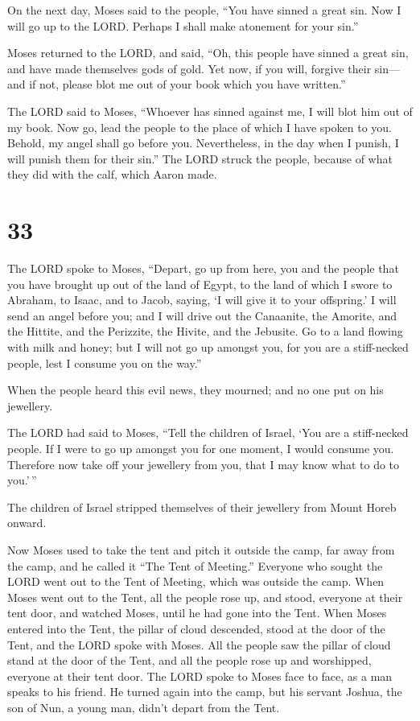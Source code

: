  On the next day, Moses said to the people, ``You have
sinned a great sin. Now I will go up to the LORD. Perhaps I shall make
atonement for your sin.''

 Moses returned to the LORD, and said, ``Oh, this people
have sinned a great sin, and have made themselves gods of gold.
 Yet now, if you will, forgive their sin---and if not,
please blot me out of your book which you have written.''

 The LORD said to Moses, ``Whoever has sinned against me, I
will blot him out of my book.  Now go, lead the people to
the place of which I have spoken to you. Behold, my angel shall go
before you. Nevertheless, in the day when I punish, I will punish them
for their sin.''  The LORD struck the people, because of
what they did with the calf, which Aaron made.

\hypertarget{section-32}{%
\section{33}\label{section-32}}

 The LORD spoke to Moses, ``Depart, go up from here, you and
the people that you have brought up out of the land of Egypt, to the
land of which I swore to Abraham, to Isaac, and to Jacob, saying, `I
will give it to your offspring.'  I will send an angel
before you; and I will drive out the Canaanite, the Amorite, and the
Hittite, and the Perizzite, the Hivite, and the Jebusite. 
Go to a land flowing with milk and honey; but I will not go up amongst
you, for you are a stiff-necked people, lest I consume you on the way.''

 When the people heard this evil news, they mourned; and no
one put on his jewellery.

 The LORD had said to Moses, ``Tell the children of Israel,
`You are a stiff-necked people. If I were to go up amongst you for one
moment, I would consume you. Therefore now take off your jewellery from
you, that I may know what to do to you.'\,''

 The children of Israel stripped themselves of their
jewellery from Mount Horeb onward.

 Now Moses used to take the tent and pitch it outside the
camp, far away from the camp, and he called it ``The Tent of Meeting.''
Everyone who sought the LORD went out to the Tent of Meeting, which was
outside the camp.  When Moses went out to the Tent, all the
people rose up, and stood, everyone at their tent door, and watched
Moses, until he had gone into the Tent.  When Moses entered
into the Tent, the pillar of cloud descended, stood at the door of the
Tent, and the LORD spoke with Moses.  All the people saw
the pillar of cloud stand at the door of the Tent, and all the people
rose up and worshipped, everyone at their tent door.  The
LORD spoke to Moses face to face, as a man speaks to his friend. He
turned again into the camp, but his servant Joshua, the son of Nun, a
young man, didn't depart from the Tent.

